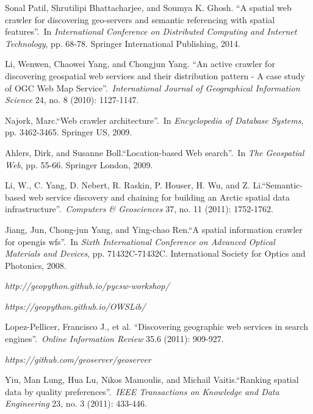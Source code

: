 \begin{thebibliography}{5}
Sonal Patil, Shrutilipi Bhattacharjee, and Soumya K. Ghosh. \textquotedblleft A spatial web crawler for discovering geo-servers and semantic referencing with spatial features\textquotedblright.\ In \textit{International Conference on Distributed Computing and Internet Technology}, pp. 68-78. Springer International Publishing, 2014.

Li, Wenwen, Chaowei Yang, and Chongjun Yang. \textquotedblleft An active crawler for discovering geospatial web services and their distribution pattern - A case study of OGC Web Map Service\textquotedblright.\ \textit{International Journal of Geographical Information Science} 24, no. 8 (2010): 1127-1147.

Najork, Marc.\textquotedblleft Web crawler architecture\textquotedblright.\ In \textit{Encyclopedia of Database Systems}, pp. 3462-3465. Springer US, 2009.

Ahlers, Dirk, and Susanne Boll.\textquotedblleft Location-based Web search\textquotedblright.\ In \textit{The Geospatial Web}, pp. 55-66. Springer London, 2009.

Li, W., C. Yang, D. Nebert, R. Raskin, P. Houser, H. Wu, and Z. Li.\textquotedblleft Semantic-based web service discovery and chaining for building an Arctic spatial data infrastructure\textquotedblright.\ \textit{Computers \& Geosciences} 37, no. 11 (2011): 1752-1762.

Jiang, Jun, Chong-jun Yang, and Ying-chao Ren.\textquotedblleft A spatial information crawler for opengis wfs\textquotedblright.\ In \textit{Sixth International Conference on Advanced Optical Materials and Devices}, pp. 71432C-71432C. International Society for Optics and Photonics, 2008.

\textit{http://geopython.github.io/pycsw-workshop/}

\textit{https://geopython.github.io/OWSLib/}

Lopez-Pellicer, Francisco J., et al.
\textquotedblleft Discovering geographic web services in search engines\textquotedblright.\
\textit{Online Information Review} 35.6 (2011): 909-927.

\textit{https://github.com/geoserver/geoserver}

Yiu, Man Lung, Hua Lu, Nikos Mamoulis, and Michail Vaitis.\textquotedblleft Ranking spatial data by quality preferences\textquotedblright.\ \textit{IEEE Transactions on Knowledge and Data Engineering} 23, no. 3 (2011): 433-446.


\end{thebibliography}
